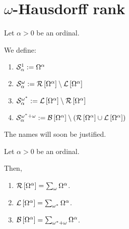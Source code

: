 \section{\texorpdfstring{$\omega$}{omega}-Hausdorff rank}

\begin{definitions}
  Let $\alpha > 0$ be an ordinal.

  We define:
  \begin{enumerate}
    \item $\mathcal{S}^{1}_{\alpha} := \Omega^{\alpha}$
    \item $\mathcal{S}^{\omega}_{\alpha} := \mathcal{R} \left[ {{\Omega^{\alpha}}} \right] \setminus \mathcal{L} \left[ {{\Omega^{\alpha}}} \right]$
    \item $\mathcal{S}^{\omega^\ast}_{\alpha} := \mathcal{L} \left[ {{\Omega^{\alpha}}} \right] \setminus \mathcal{R} \left[ {{\Omega^{\alpha}}} \right]$
    \item $\mathcal{S}^{\omega^\ast + \omega}_{\alpha} := \mathcal{B} \left[ {{\Omega^{\alpha}}} \right] \setminus \left( { \mathcal{R} \left[ {{\Omega^{\alpha}}} \right] \cup \mathcal{L} \left[ {{\Omega^{\alpha}}} \right] } \right)$
  \end{enumerate}

  The names will soon be justified.
\end{definitions}

\begin{lemma}
  Let $\alpha > 0$ be an ordinal.

  Then,
  \begin{enumerate}
    \item $\mathcal{R} \left[ {{\Omega^{\alpha}}} \right] = \sum_{\omega}{\Omega^{\alpha}}$.
    \item $\mathcal{L} \left[ {{\Omega^{\alpha}}} \right] = \sum_{\omega^\ast}{\Omega^{\alpha}}$.
    \item $\mathcal{B} \left[ {{\Omega^{\alpha}}} \right] = \sum_{\omega^\ast + \omega}{\Omega^{\alpha}}$.
  \end{enumerate}
\end{lemma}

